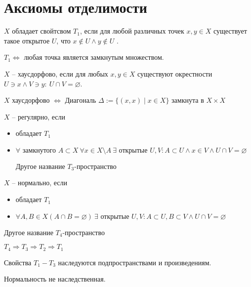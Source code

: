 \documentclass[12pt]{report}
\begin{document}
\section{Аксиомы отделимости}
\begin{defn}
    $ X$ обладает свойтсвом $ T_1$, если для любой различных точек $ x, y \in X$ существует такое открытое $ U$, что $ x \not\in U \wedge y \not\in U$ .
\end{defn}
\begin{thm}
    $ T_1 \Longleftrightarrow $  любая точка является замкнутым множеством.
\end{thm}
\begin{defn}
    $ X$ -- хаусдорфово, если для любых $ x, y \in  X$ существуют окрестности $ U \ni x \wedge V \ni y: ~ U \cap V = \varnothing$.
\end{defn}
\begin{defn}
    $ X$ хаусдорфово $ \Longleftrightarrow $ Диагональ $ \Delta := \{(x, x) \mid x \in  X\}$ замкнута в $ X \times X$
\end{defn}
\begin{defn}
    $ X$ -- регулярно, если 
    \begin{itemize}
	\item обладает $ T_1$
	\item $ \forall  \text{ замкнутого }A \subset X~ \forall x \in  X \setminus A~ \exists \text{ открытые } U, V : A \subset  U \wedge x \in V \wedge U \cap  V = \varnothing $

	    Другое название $ T_3$-пространство
    \end{itemize}
\end{defn}
\begin{defn}
    $ X$ -- нормально, если 
    \begin{itemize}
        \item обладает $ T_1$ 
	\item $ \forall  A, B \in  X (A \cap  B = \varnothing) ~ \exists  \text{ открытые } U, V: A \subset U,  B  \subset V  \wedge U \cap  V= \varnothing$
	\end{itemize}

	    Другое название $ T_4$-пространство
\end{defn}
\begin{st}
    $ T_4 \Rightarrow T_3 \Rightarrow  T_2 \Rightarrow T_1$
\end{st}
\begin{probl}
    Свойства $ T_1 - T_3$ наследуются подпространствами и произведениям.

    Нормальность не наследственная.
\end{probl}
\end{document}
